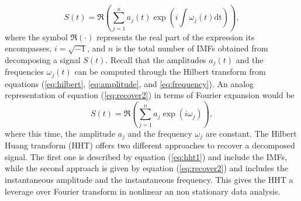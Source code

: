\documentclass[../Main/thesis.tex]{subfiles}
\begin{document}
\begin{equation}\label{eq:recover2}
S(t) = \Re{\left( \sum_{j=1}^{n}a_{j}(t)\exp\left(i\int\omega_{j}(t)\mathrm{dt}\right)  \right)},
\end{equation} 
where the symbol $\Re(\cdot)$ represents the real part of the expression its encompasses, $i=\sqrt{-1}$, and $n$ is the total number of IMFs obtained from decomposing a signal $S(t)$. Recall that the amplitudes $a_{j}(t)$ and the frequencies $\omega_{j}(t)$ can be computed through the Hilbert transform from equations (\ref{eq:hilbert}, \ref{eq:amplitude}, and \ref{eq:frequency}). An analog representation of equation (\ref{eq:recover2}) in terms of Fourier expansion would be 
\begin{equation}\label{eq:recoverFourier}
S(t) = \Re{\left( \sum_{j=1}^{n}a_{j}\exp\left(i\omega_{j}\right)  \right)},
\end{equation} 
where this time, the amplitude $a_{j}$ and the frequency $\omega_{j}$ are constant. The Hilbert Huang transform (HHT) offers two different approaches to recover a decomposed signal. The first one is described by equation (\ref{eq:hht1}) and include the IMFs, while the second approach is given by equation (\ref{eq:recover2}) and includes the instantaneous amplitude and the instantaneous frequency. This gives the HHT a leverage over Fourier transform in nonlinear an non stationary data analysis.
\end{document}
